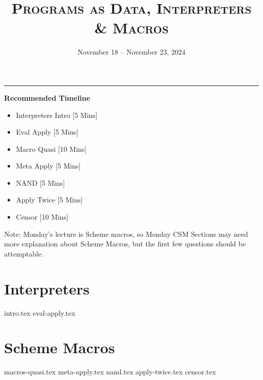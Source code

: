 \documentclass{exam}
\title{\textsc{Programs as Data, Interpreters \& Macros}}
\date{November 18 -- November 23, 2024}
\begin{document}
\maketitle
\rule{\textwidth}{0.15em}

\begin{meta} %
    \begin{blocksection}
        \textbf{Recommended Timeline}
        \begin{itemize}
            \item Interpreters Intro [5 Mins]
            \item Eval Apply [5 Mins]
            \item Macro Quasi [10 Mins]
            \item Meta Apply [5 Mins]
            \item NAND [5 Mins]
            \item Apply Twice [5 Mins]
            \item Censor [10 Mins]
        \end{itemize}

        Note: Monday's lecture is Scheme macros, so Monday CSM Sections may need more explanation about Scheme Macros, but the first few questions should be attemptable. 
    \end{blocksection}
\end{meta}

\section{Interpreters}
\begin{questions}
{intro.tex}
{eval-apply.tex}
\end{questions}

\section{Scheme Macros}
\begin{questions}
    {macros-quasi.tex}
    {meta-apply.tex}
    {nand.tex}
    {apply-twice.tex}
    {censor.tex}
\end{questions}
\end{document}
